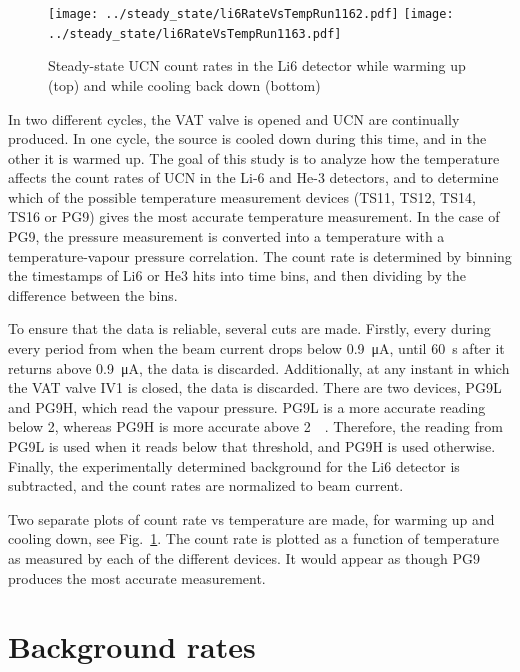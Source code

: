 \documentclass[10pt,letterpaper]{article}
\begin{document}
\begin{figure}
\centering
\texttt{[image: ../steady\_state/li6RateVsTempRun1162.pdf]}
\texttt{[image: ../steady\_state/li6RateVsTempRun1163.pdf]}
\caption{Steady-state UCN count rates in the Li6 detector while warming up (top) and while cooling back down (bottom)}
\label{fig:steadystate}
\end{figure}

In two different cycles, the VAT valve is opened and UCN are continually produced. In one cycle, the source is cooled down during this time, and in the other it is warmed up. The goal of this study is to analyze how the temperature affects the count rates of UCN in the Li-6 and He-3 detectors, and to determine which of the possible temperature measurement devices (TS11, TS12, TS14, TS16 or PG9) gives the most accurate temperature measurement. In the case of PG9, the pressure measurement is converted into a temperature with a temperature-vapour pressure correlation. The count rate is determined by binning the timestamps of Li6 or He3 hits into time bins, and then dividing by the difference between the bins.

To ensure that the data is reliable, several cuts are made. Firstly, every during every period from when the beam current drops below \SI{0.9}{\micro\ampere}, until \SI{60}{\second} after it returns above \SI{0.9}{\micro\ampere}, the data is discarded. Additionally, at any instant in which the VAT valve IV1 is closed, the data is discarded. There are two devices, PG9L and PG9H, which read the vapour pressure. PG9L is a more accurate reading below \SI{2}{\torr}, whereas PG9H is more accurate above \SI{2}{\milli\torr}. Therefore, the reading from PG9L is used when it reads below that threshold, and PG9H is used otherwise. Finally, the experimentally determined background for the Li6 detector is subtracted, and the count rates are normalized to beam current.

Two separate plots of count rate vs temperature are made, for warming up and cooling down, see Fig.~\ref{fig:steadystate}. The count rate is plotted as a function of temperature as measured by each of the different devices. It would appear as though PG9 produces the most accurate measurement.





\section{Background rates}
\label{sec:background}
\end{document}
